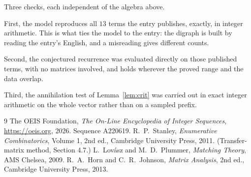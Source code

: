 \documentclass[11pt,a4paper]{article}
\theoremstyle{plain}
\theoremstyle{definition}
\begin{document}
Three checks, each independent of the algebra above.

First, the model reproduces all $13$ terms the entry publishes, exactly, in integer
arithmetic. This is what ties the model to the entry: the digraph is built by reading the
entry's English, and a misreading gives different counts.

Second, the conjectured recurrence was evaluated directly on those published terms, with no
matrices involved, and holds wherever the proved range and the data overlap.

Third, the annihilation test of Lemma~\ref{lem:crit} was carried out in exact integer
arithmetic on the whole vector rather than on a sampled prefix.

\begin{thebibliography}{9}
 The OEIS Foundation, \emph{The On-Line Encyclopedia of Integer
Sequences}, \url{https://oeis.org}, 2026. Sequence A220619.
 R.~P.~Stanley, \emph{Enumerative Combinatorics}, Volume 1, 2nd ed.,
Cambridge University Press, 2011. (Transfer-matrix method, Section 4.7.)
 L.~Lov\'asz and M.~D.~Plummer, \emph{Matching Theory}, AMS Chelsea,
2009.
 R.~A.~Horn and C.~R.~Johnson, \emph{Matrix Analysis}, 2nd ed., Cambridge
University Press, 2013.
\end{thebibliography}
\end{document}
